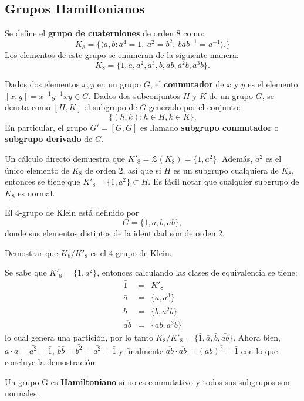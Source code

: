 \subsection{Grupos Hamiltonianos}
Se define el \textbf{grupo de cuaterniones} de orden 8 como:\[ K_8 = \{ \langle a,b \colon a^4 =1, \ a^2 = b ^2, \ bab^{-1} = a^{-1} \rangle. \} \]
Los elementos de este grupo se enumeran de la siguiente manera:
\[ K_8 = \{ 1,a,a^2, a^3, b, ab, a^2b, a^3b \}. \]
\begin{definicion}
Dados dos elementos $x,y$ en un grupo $G$, el \textbf{conmutador} de $x$ y $y$ es el elemento $[x,y] = x^{-1}y^{-1}xy \in G$. Dados dos subconjuntos $H$ y $K$ de un grupo $G$, se denota como $[H,K]$ el subgrupo de $G$ generado por el conjunto:
\[\{(h,k) \colon h \in H, k \in K\}. \]
En particular, el grupo $G'=[G,G]$ es llamado \textbf{subgrupo conmutador} o \textbf{subgrupo derivado} de $G$.
\end{definicion}
Un cálculo directo demuestra que $K'_8 = \mathcal{Z}(K_8) = \{1, a^2\}$. Además, $a^2$ es el único elemento de $K_8$ de orden 2, así que si $H$ es un subgrupo cualquiera de $K_8$, entonces se tiene que $K'_8 = \{1,a^2\} \subset H$. Es fácil notar que cualquier subgrupo de $K_8$ es normal.
\begin{definicion}
El 4-grupo de Klein está definido por
\[ G = \{1,a,b,ab\}, \] donde sus elementos distintos de la identidad son de orden 2.
\end{definicion}
\begin{ejercicio}\label{ejer:klein}
Demostrar que $K_8/K'_8$ es el 4-grupo de Klein.
\end{ejercicio} 
\begin{solucion}
Se sabe que $K'_8 = \{1,a^2\}$, entonces calculando las clases de equivalencia se tiene:
\begin{eqnarray*}
\bar{1} &=& K'_8\\
\bar{a} &=& \{a, a^3\} \\
\bar{b} &=&  \{b, a^2b \} \\
\overline{ab} &=& \{ ab, a^3b \}
\end{eqnarray*}
lo cual genera una partición, por lo tanto $K_8/K'_8 = \{\bar{1},\bar{a},\bar{b}, \bar{ab}  \}$. Ahora bien, $\bar{a}\cdot\bar{a} =\bar{a^2}=\bar{1}, \ \bar{b}\bar{b} = \bar{b^2} = \bar{a^2} = \bar{1}$ y finalmente $\overline{ab}\cdot\overline{ab} = \overline{(ab)^2} = \bar{1}$ con lo que concluye la demostración. \qedsymbol
\end{solucion}
\begin{definicion}
Un grupo G es  \textbf{Hamiltoniano} si no es conmutativo y todos sus subgrupos son normales. 
\end{definicion}
